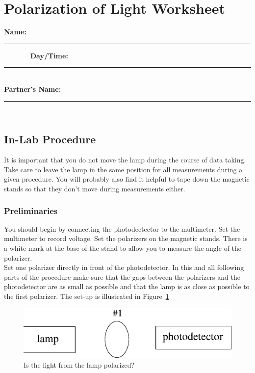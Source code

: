 \vfill
\pagebreak
$$
$$
\vfill
\clearpage
\newpage

\renewcommand{\thesection}{\thechapter.W}

\section{Polarization of Light Worksheet}
{\bf \Large Name:}~ \rule{5cm}{.1mm}~~~~~~~
{\bf \Large Day/Time:}~\rule{3cm}{.1mm}\\
{\bf \Large Partner's Name:}~\rule{6cm}{.1mm}\\
\subsection{In-Lab Procedure}
\label{sec:pol:proc}

It is important that you do not move the lamp during the course of 
data taking. Take care to leave the lamp in the same position for all 
measurements during a given procedure.  You will probably also find it helpful
to tape down the magnetic stands so that they don't move during 
measurements either.

\subsubsection{Preliminaries}

You should begin by connecting the photodectector to the multimeter. 
Set the multimeter to record voltage. Set the polarizers on the magnetic 
stands.  There is a white mark at the base of the stand to allow you to 
measure the angle of the polarizer. \\

\noindent Set one polarizer directly in front of the photodetector. In this
and all following parts of the procedure make sure that the gaps between
the polarizers and the photodetector are as small as possible and that 
the lamp is as close as possible to the first polarizer. The set-up is 
illustrated in Figure~\ref{fig:pol:onepol}
\begin{figure}[htb]
\centering 
\epsfxsize=7cm \includegraphics[scale=0.6]{7_polarization/onepol.eps}
\caption{Is the light from the lamp polarized?}
\label{fig:pol:onepol}
\end{figure}

